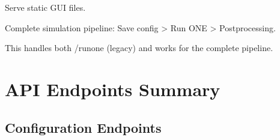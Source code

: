 \documentclass[a4paper,11pt,english,openany,oneside]{sphinxmanual}
\begin{document}

\begin{fulllineitems}
\label{\detokenize{modules/api:app.routes.serve_gui_static}}
\pysigstartsignatures
\pysiglinewithargsret
{}
{}
{}
\pysigstopsignatures
\sphinxAtStartPar
Serve static GUI files.

\end{fulllineitems}


\begin{fulllineitems}
\label{\detokenize{modules/api:app.routes.run_one_pipeline}}
\pysigstartsignatures
\pysiglinewithargsret
{}
{}
{}
\pysigstopsignatures
\sphinxAtStartPar
Complete simulation pipeline: Save config \sphinxhyphen{}> Run ONE \sphinxhyphen{}> Post\sphinxhyphen{}processing.

\sphinxAtStartPar
This handles both /run\sphinxhyphen{}one (legacy) and works for the complete pipeline.

\end{fulllineitems}



\section{API Endpoints Summary}
\label{\detokenize{modules/api:api-endpoints-summary}}

\subsection{Configuration Endpoints}
\label{\detokenize{modules/api:configuration-endpoints}}
\end{document}
